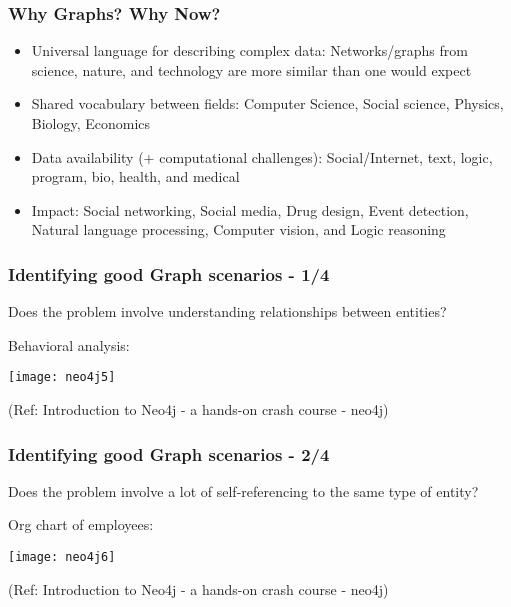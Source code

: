 \begin{frame}[fragile]\frametitle{Why Graphs? Why Now?}

\begin{itemize}
\item Universal language for describing complex data: Networks/graphs from science, nature, and technology are more similar than one would expect
\item Shared vocabulary between fields: Computer Science, Social science, Physics, Biology, Economics 
\item Data availability (+ computational challenges): Social/Internet, text, logic, program, bio, health, and medical
\item Impact: Social networking, Social media, Drug design, Event detection, Natural language processing, Computer vision, and Logic reasoning
\end{itemize}

\end{frame}

\begin{frame}\frametitle{Identifying good Graph scenarios - 1/4}

Does the problem involve understanding relationships between entities?

Behavioral analysis:

\begin{center}
\texttt{[image: neo4j5]}
\end{center}	  

{\tiny (Ref: Introduction to Neo4j - a hands-on crash course - neo4j)}
\end{frame}

\begin{frame}\frametitle{Identifying good Graph scenarios - 2/4}

Does the problem involve a lot of self-referencing to the same type of entity?

Org chart of employees:

\begin{center}
\texttt{[image: neo4j6]}
\end{center}	  

{\tiny (Ref: Introduction to Neo4j - a hands-on crash course - neo4j)}
\end{frame}

